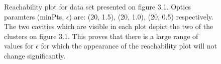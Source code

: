 \begin{figure}
  \centering
  \caption{Reachability plot for data set presented on figure 3.1. Optics
  paramters (minPts, $\epsilon$) are: (20, 1.5), (20, 1.0), (20, 0.5)
  respectively. The two cavities which are visible in each plot depict the two
  of the clusters on figure 3.1. This proves that there is a large range of
  values for $\epsilon$ for which the appearance of the reachability plot will
  not change significantly.}
  \label{reach}
\end{figure}
